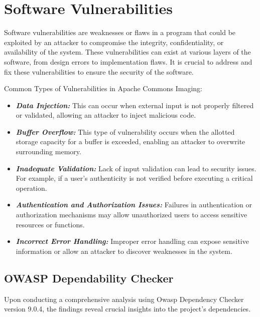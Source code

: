 \documentclass[sigconf]{acmart}
\begin{document}
\section{Software Vulnerabilities}
Software vulnerabilities are weaknesses or flaws in a program that could be exploited by an attacker to compromise the integrity, confidentiality, or availability of the system. These vulnerabilities can exist at various layers of the software, from design errors to implementation flaws. It is crucial to address and fix these vulnerabilities to ensure the security of the software.


Common Types of Vulnerabilities in Apache Commons Imaging:

\begin{itemize}
    \item \textbf{\textit{Data Injection:}} This can occur when external input is not properly filtered or validated, allowing an attacker to inject malicious code.
    
    \item \textbf{\textit{Buffer Overflow:}} This type of vulnerability occurs when the allotted storage capacity for a buffer is exceeded, enabling an attacker to overwrite surrounding memory.
    
    \item \textbf{\textit{Inadequate Validation:}} Lack of input validation can lead to security issues. For example, if a user's authenticity is not verified before executing a critical operation.
    
    \item \textbf{\textit{Authentication and Authorization Issues:}} Failures in authentication or authorization mechanisms may allow unauthorized users to access sensitive resources or functions.
    
    \item \textbf{\textit{Incorrect Error Handling:}} Improper error handling can expose sensitive information or allow an attacker to discover weaknesses in the system.
\end{itemize}

\subsection{OWASP Dependability Checker}
Upon conducting a comprehensive analysis using Owasp Dependency Checker\cite{owasp-dependency-check} version 9.0.4, the findings reveal crucial insights into the project's dependencies.
\end{document}
